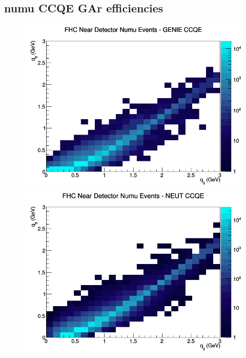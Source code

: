 \subsection{numu CCQE GAr efficiencies}
\begin{figure}[h]
\includegraphics[width=\linewidth]{eff_q0_q3/GAr/CCQE_FHC_ND_numu_q3_q0_GENIE.png}
\endminipage
{}
\includegraphics[width=\linewidth]{eff_q0_q3/GAr/CCQE_FHC_ND_numu_q3_q0_NEUT.png}
\endminipage
{}

\end{figure}
